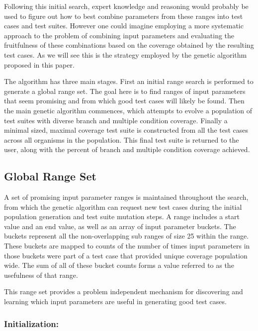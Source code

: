 \documentclass[runningheads]{llncs}
\begin{document}
Following this initial search, expert knowledge and reasoning would probably be used to figure out how to best combine parameters from these ranges into test cases and test suites. However one could imagine employing a more systematic approach to the problem of combining input parameters and evaluating the fruitfulness of these combinations based on the coverage obtained by the resulting test cases. As we will see this is the strategy employed by the genetic algorithm proposed in this paper.

The algorithm has three main stages. First an initial range search is performed to generate a global range set. The goal here is to find ranges of input parameters that seem promising and from which good test cases will likely be found. Then the main genetic algorithm commences, which attempts to evolve a population of test suites with diverse branch and multiple condition coverage. Finally a minimal sized, maximal coverage test suite is constructed from all the test cases across all organisms in the population. This final test suite is returned to the user, along with the percent of branch and multiple condition coverage achieved. 


\subsection{Global Range Set}

A set of promising input parameter ranges is maintained throughout the search, from which the genetic algorithm can request new test cases during the initial population generation and test suite mutation steps. A range includes a start value and an end value, as well as an array of input parameter buckets. The buckets represent all the non-overlapping sub ranges of size 25 within the range. These buckets are mapped to counts of the number of times input parameters in those buckets were part of a test case that provided unique coverage population wide. The sum of all of these bucket counts forms a value referred to as the usefulness of that range.  

This range set provides a problem independent mechanism for discovering and learning which input parameters are useful in generating good test cases.

\subsubsection{Initialization:}
\end{document}
